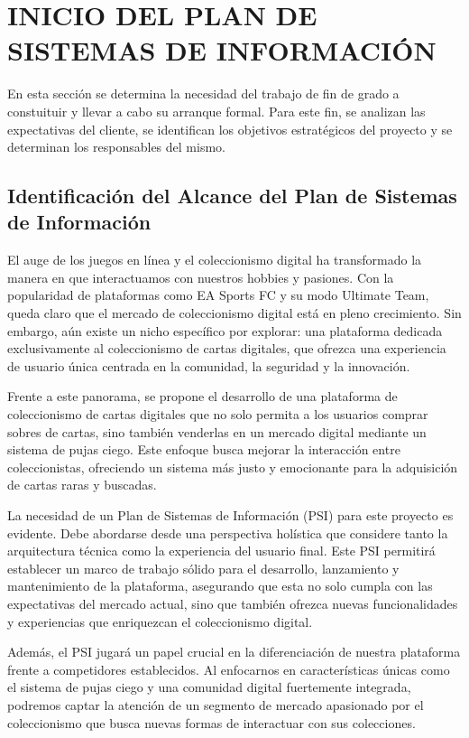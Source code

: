 
\section{INICIO DEL PLAN DE SISTEMAS DE INFORMACIÓN}
En esta sección se determina la necesidad del trabajo de fin de grado a constuituir y llevar a cabo su arranque formal. 
Para este fin, se analizan las expectativas del cliente, se identifican los objetivos estratégicos del proyecto y se determinan los responsables del mismo.
 
\subsection{Identificación del Alcance del Plan de Sistemas de Información }
El auge de los juegos en línea y el coleccionismo digital ha transformado la manera en que interactuamos con nuestros hobbies y pasiones. Con la popularidad de plataformas como EA Sports FC y su modo Ultimate Team, queda claro que el mercado de coleccionismo digital está en pleno crecimiento. Sin embargo, aún existe un nicho específico por explorar: una plataforma dedicada exclusivamente al coleccionismo de cartas digitales, que ofrezca una experiencia de usuario única centrada en la comunidad, la seguridad y la innovación.

Frente a este panorama, se propone el desarrollo de una plataforma de coleccionismo de cartas digitales que no solo permita a los usuarios comprar sobres de cartas, sino también venderlas en un mercado digital mediante un sistema de pujas ciego. Este enfoque busca mejorar la interacción entre coleccionistas, ofreciendo un sistema más justo y emocionante para la adquisición de cartas raras y buscadas.

La necesidad de un Plan de Sistemas de Información (PSI) para este proyecto es evidente. Debe abordarse desde una perspectiva holística que considere tanto la arquitectura técnica como la experiencia del usuario final. Este PSI permitirá establecer un marco de trabajo sólido para el desarrollo, lanzamiento y mantenimiento de la plataforma, asegurando que esta no solo cumpla con las expectativas del mercado actual, sino que también ofrezca nuevas funcionalidades y experiencias que enriquezcan el coleccionismo digital.

Además, el PSI jugará un papel crucial en la diferenciación de nuestra plataforma frente a competidores establecidos. Al enfocarnos en características únicas como el sistema de pujas ciego y una comunidad digital fuertemente integrada, podremos captar la atención de un segmento de mercado apasionado por el coleccionismo que busca nuevas formas de interactuar con sus colecciones.

